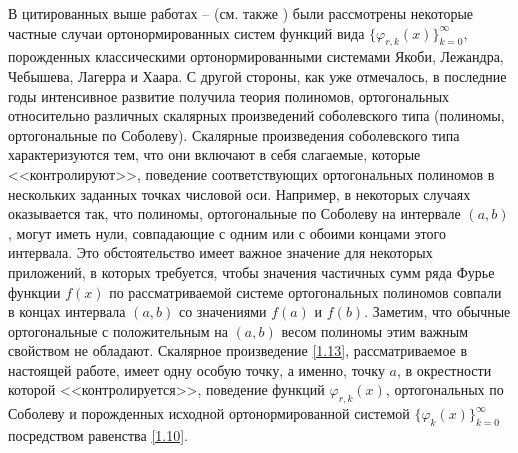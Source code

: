 В цитированных выше   работах  \cite{Shar11} -- \cite{Shar18} (см. также  \cite{Shar19})   были рассмотрены некоторые частные случаи ортонормированных систем функций вида $\{\varphi_{r,k}(x)\}_{k=0}^\infty$, порожденных классическими ортонормированными системами Якоби, Лежандра, Чебышева, Лагерра и Хаара. С другой стороны, как уже отмечалось, в последние годы интенсивное развитие получила  теория полиномов, ортогональных относительно различных скалярных произведений соболевского типа (полиномы, ортогональные по Соболеву). Скалярные произведения соболевского типа характеризуются тем, что они включают в себя слагаемые, которые <<контролируют>>, поведение соответствующих ортогональных полиномов  в нескольких заданных точках числовой оси. Например, в некоторых случаях оказывается так, что полиномы, ортогональные по Соболеву на интервале $(a,b)$, могут иметь нули, совпадающие с одним или с обоими концами этого интервала. Это обстоятельство имеет важное значение для некоторых приложений, в которых требуется, чтобы значения  частичных сумм ряда Фурье функции $f(x)$ по рассматриваемой системе ортогональных полиномов совпали в концах интервала $(a,b)$ со значениями $f(a)$ и $f(b)$.  Заметим, что обычные ортогональные с положительным на  $(a,b)$ весом полиномы этим важным свойством не обладают. Скалярное произведение \eqref{1.13}, рассматриваемое в настоящей работе, имеет одну особую точку, а именно, точку $a$, в окрестности которой <<контролируется>>, поведение функций $\varphi_{r,k}(x)$, ортогональных по Соболеву и порожденных исходной ортонормированной системой $\{\varphi_{k}(x)\}_{k=0}^\infty$ посредством равенства \eqref{1.10}.


